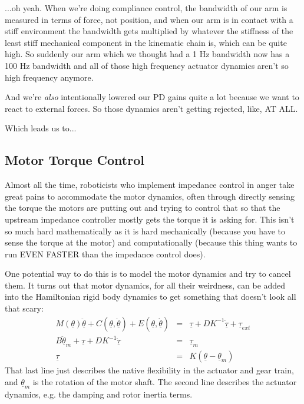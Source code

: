 \documentclass[]{article}
\begin{document}
...oh yeah. When we're doing compliance control, the bandwidth of our arm is measured in terms of force, not position, and when our arm is in contact with a stiff environment the bandwidth gets multiplied by whatever the stiffness of the least stiff mechanical component in the kinematic chain is, which can be quite high. So suddenly our arm which we thought had a 1 Hz bandwidth now has a 100 Hz bandwidth and all of those high frequency actuator dynamics aren't so high frequency anymore.

And we're \textit{also} intentionally lowered our PD gains quite a lot because we want to react to external forces. So those dynamics aren't getting rejected, like, AT ALL.

Which leads us to...
\subsection{Motor Torque Control}
Almost all the time, roboticists who implement impedance control in anger take great pains to accommodate the motor dynamics, often through directly sensing the torque the motors are putting out and trying to control that so that the upstream impedance controller mostly gets the torque it is asking for. This isn't so much hard mathematically as it is hard mechanically (because you have to sense the torque at the motor) and computationally (because this thing wants to run EVEN FASTER than the impedance control does).

One potential way to do this is to model the motor dynamics and try to cancel them. It turns out that motor dynamics, for all their weirdness, can be added into the Hamiltonian rigid body dynamics to get something that doesn't look all that scary:
\begin{eqnarray}
 M(\underline{\theta})\ddot{\underline{\theta}} + C(\underline{\theta}, \dot{\underline{\theta}}) + E(\underline{\theta}, \dot{\underline{\theta}}) & = & \underline{\tau} + DK^{-1}\dot{\underline{\tau}} + \underline{\tau}_{ext} \nonumber \\
 B\underline{\ddot{\theta}}_{m} +\underline{\tau}+DK^{-1}\dot{\underline{\tau}} & = & \underline{\tau}_{m} \nonumber \\
 \underline{\tau} & = & K(\underline{\theta}-\underline{\theta}_{m}) \nonumber
\end{eqnarray}
That last line just describes the native flexibility in the actuator and gear train, and $\underline{\theta}_{m}$ is the rotation of the motor shaft. The second line describes the actuator dynamics, e.g. the damping and rotor inertia terms.
\end{document}
